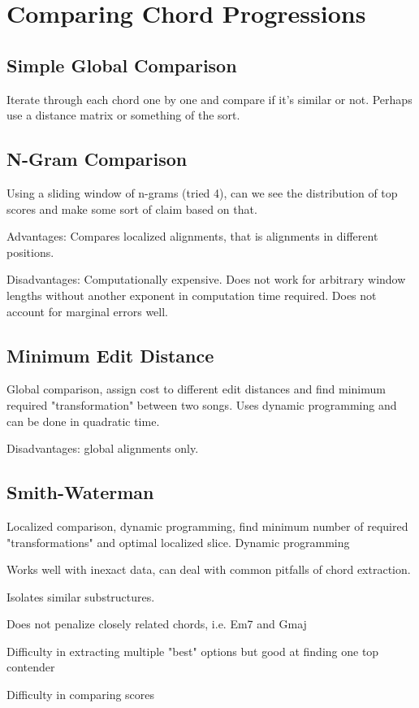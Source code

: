 \section{Comparing Chord Progressions}

\subsection{Simple Global Comparison}

\item Iterate through each chord one by one and compare if it's similar or not. Perhaps use a distance matrix or something of the sort.

\subsection{N-Gram Comparison}

\item Using a sliding window of n-grams (tried 4), can we see the distribution of top scores and make some sort of claim based on that.

\item Advantages: Compares localized alignments, that is alignments in different positions.

\item Disadvantages: Computationally expensive. Does not work for arbitrary window lengths without another exponent in computation time required. Does not account for marginal errors well.

\subsection{Minimum Edit Distance}

\item Global comparison, assign cost to different edit distances and find minimum required "transformation" between two songs. Uses dynamic programming and can be done in quadratic time.

\item Disadvantages: global alignments only.

\subsection{Smith-Waterman}

\item Localized comparison, dynamic programming, find minimum number of required "transformations" and optimal localized slice. Dynamic programming

\item Works well with inexact data, can deal with common pitfalls of chord extraction.

\item Isolates similar substructures.

\item Does not penalize closely related chords, i.e. Em7 and Gmaj

\item Difficulty in extracting multiple "best" options but good at finding one top contender

\item Difficulty in comparing scores